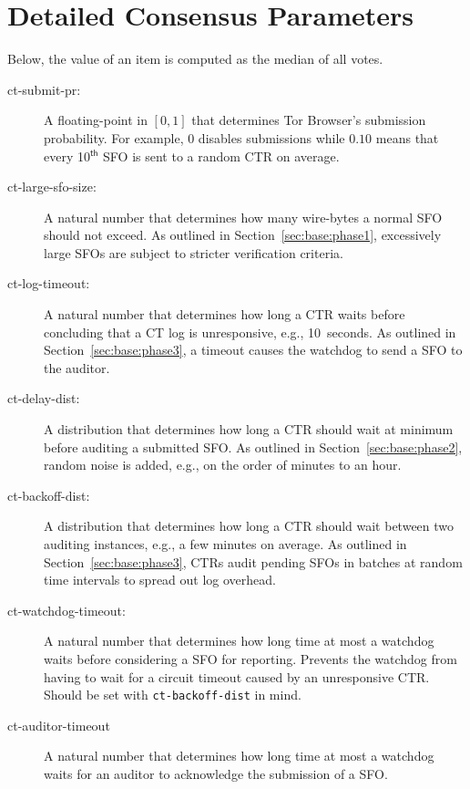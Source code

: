 \section{Detailed Consensus Parameters} \label{app:consensus-params} 

Below, the value of an item is computed as the median of all votes.
\begin{description}
    \item[ct-submit-pr:] A floating-point in $[0,1]$ that determines Tor
        Browser's submission probability.  For example, $0$ disables submissions
        while $0.10$ means that every 10$^{\mathsf{th}}$ SFO is sent to a random
        CTR on average.
    \item[ct-large-sfo-size:] A natural number that determines how many
        wire-bytes a normal SFO should not exceed.  As outlined in
        Section~\ref{sec:base:phase1}, excessively large SFOs are subject to
        stricter verification criteria.
    \item[ct-log-timeout:] A natural number that determines how long a CTR waits
        before concluding that a CT log is unresponsive, e.g., 10~seconds. As
        outlined in Section~\ref{sec:base:phase3}, a timeout causes the watchdog
        to send a SFO to the auditor.
    \item[ct-delay-dist:] A distribution that determines how long a CTR should
        wait at minimum before auditing a submitted SFO\@.  As outlined in
        Section~\ref{sec:base:phase2}, random noise is added, e.g., on the order
        of minutes to an hour.
    \item[ct-backoff-dist:]
        A distribution that determines how long a CTR should wait between two
        auditing instances, e.g., a few minutes on average.  As outlined in
        Section~\ref{sec:base:phase3}, CTRs audit pending SFOs in batches at
        random time intervals to spread out log overhead.
    \item[ct-watchdog-timeout:] A natural number that determines how long time
    at most a watchdog waits before considering a SFO for reporting. Prevents
    the watchdog from having to wait for a circuit timeout caused by an
    unresponsive CTR. Should be set with \texttt{ct-backoff-dist} in mind.
    \item[ct-auditor-timeout] A natural number that determines how long time at
    most a watchdog waits for an auditor to acknowledge the submission of a SFO.
\end{description}

